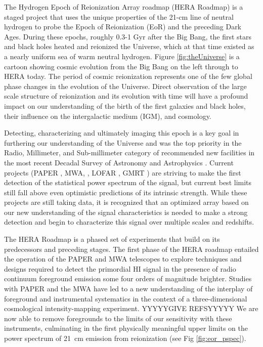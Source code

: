 \documentclass[ars]{copernicus}
\begin{document}
\introduction  %
\label{sec:intro}
The Hydrogen Epoch of Reionization Array roadmap (HERA Roadmap) is a staged project
that uses the unique properties of the 21-cm line of neutral hydrogen to probe the
Epoch of Reionization (EoR) and the preceding Dark Ages. During these epochs, roughly
0.3-1 Gyr after the Big Bang, the first stars and black holes heated and reionized
the Universe, which at that time existed as a nearly uniform sea of warm neutral
hydrogen.  Figure \ref{fig:theUniverse} is a cartoon showing cosmic evolution from the Big Bang on the left through
to HERA today. The period of cosmic reionization represents one of the few global
phase changes in the evolution of the Universe.
Direct observation of the large scale structure of reionization and its
evolution with time will have a profound impact on our understanding of the birth of
the first galaxies and black holes, their influence on the intergalactic medium
(IGM), and cosmology.

Detecting, characterizing and ultimately imaging this epoch is a key goal in
furthering our understanding of the Universe and was the top priority in the Radio,
Millimeter, and Sub-millimeter category of recommended new facilities in the most
recent Decadal Survey of Astronomy and Astrophysics \citet{NWNH}. Current projects
(PAPER \citep{2014ApJ...788..106P}, 
MWA, \citep{2013PASA...30....7T},
LOFAR \citep{2013A&A...550A.136Y}, 
GMRT \citep{2011MNRAS.413.1174P}) are striving to make the first detection of the statistical
power spectrum of the signal, but current best limits still fall above even
optimistic predictions of its intrinsic strength. While these projects are still
taking data, it is recognized that an optimized array based on our new understanding
of the signal characteristics is needed to make a strong detection and begin to
characterize this signal over multiple scales and redshifts.

The HERA Roadmap is a phased set of experiments that build on its predecessors and preceding stages.
The first phase of the HERA roadmap entailed the operation of the
PAPER and MWA telescopes to explore techniques and designs required to
detect the primordial HI signal in the presence of radio continuum
foreground emission some four orders of magnitude brighter. Studies
with PAPER and the MWA have led to a new understanding of the
interplay of foreground and instrumental systematics in the context of
a three-dimensional cosmological intensity-mapping experiment.  YYYYYGIVE REFSYYYYY 
We are
now able to remove foregrounds to the limits of our sensitivity with
these instruments, culminating in the first physically meaningful
upper limits on the power spectrum of 21~cm emission from
reionization (see Fig \ref{fig:eor_pspec}).
\end{document}
